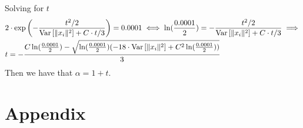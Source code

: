 \documentclass[a4paper,12pt]{article}
\begin{document}
Solving for $t$
\begin{align*}
&2 \cdot \exp \left (- \frac{t^2/2}{\text{Var} \left [ \|x_i\|^2  \right] + C \cdot t/3}\right) = 0.0001
\iff \ln(\frac{0.0001}{2}) = -\frac{t^2/2}{\text{Var} \left [ \|x_i\|^2  \right] + C \cdot t/3}
\implies \\ &t = - \frac{C \ln(\frac{0.0001}{2}) - 
\sqrt{\ln(\frac{0.0001}{2})(-18 \cdot \text{Var} \left [ \|x_i\|^2  \right] + C^2\ln(\frac{0.0001}{2}))}}{3}
\end{align*}
Then we have that $\alpha = 1 + t$.



{}


\newpage
\appendix
\section*{Appendix}
\end{document}
